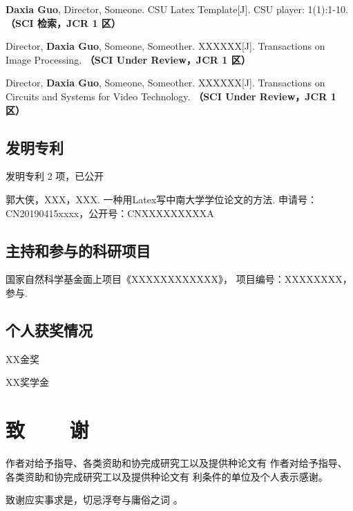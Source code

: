 \else
\begin{enumerate}[label={[\arabic*]},itemindent=2em,wide]
\item \textbf{Daxia Guo}, Director, Someone. CSU Latex Template[J]. CSU player: 1(1):1-10. {\bfseries \heiti（SCI 检索，JCR 1 区）}
\item Director, \textbf{Daxia Guo}, Someone, Someother. XXXXXX[J]. Transactions on Image Processing. {\bfseries \heiti（SCI Under Review，JCR 1 区）}
\item Director, \textbf{Daxia Guo}, Someone, Someother. XXXXXX[J]. Transactions on Circuits and Systems for Video Technology. {\bfseries \heiti（SCI Under Review，JCR 1 区）}
\end{enumerate}
\fi
\subsection*{发明专利}
\ifblindreview
\noindent
发明专利 2 项，已公开
\else
\begin{enumerate}[label={[\arabic*]},itemindent=2em,wide]
\item 郭大侠，XXX，XXX. 一种用Latex写中南大学学位论文的方法. 申请号：CN20190415xxxx，公开号：CNXXXXXXXXXA
\end{enumerate}
\fi

\ifblindreview
\else
\subsection*{主持和参与的科研项目}
\begin{enumerate}[label={[\arabic*]}]
\item 国家自然科学基金面上项目《XXXXXXXXXXXX》， 项目编号：XXXXXXXX，参与.
\end{enumerate}

\subsection*{个人获奖情况}
\noindent
\begin{enumerate}[label={[\arabic*]},itemindent=2em,wide]
\item XX金奖
\item XX奖学金
\end{enumerate}
\fi

\newpage

\ifblindreview
\else

\section{{致~~~~谢}} %

作者对给予指导、各类资助和协完成研究工以及提供种论文有 作者对给予指导、各类资助和协完成研究工以及提供种论文有 利条件的单位及个人表示感谢。

致谢应实事求是，切忌浮夸与庸俗之词 。

\newpage
\fi